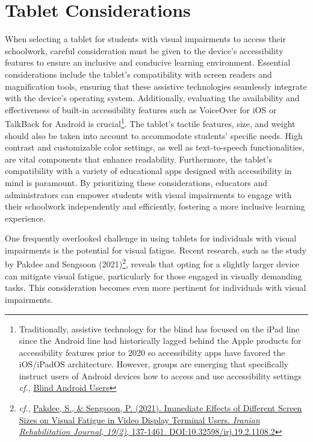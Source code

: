 \documentclass[12pt,letterpaper,twoside]{extreport}
\begin{document}
\hypertarget{tablet-considerations}{}\section{Tablet Considerations}\label{tab:tablelet-considerations}

When selecting a tablet for students with visual impairments to access their schoolwork, careful consideration must be given to the device's accessibility features to ensure an inclusive and conducive learning environment. Essential considerations include the tablet's compatibility with screen readers and magnification tools, ensuring that these assistive technologies seamlessly integrate with the device's operating system. Additionally, evaluating the availability and effectiveness of built-in accessibility features such as VoiceOver for iOS or TalkBack for Android is crucial\footnote{Traditionally, assistive technology for the blind has focused on the iPad line since the Android line had historically lagged behind the Apple products for accessibility features prior to 2020 so accessibility apps have favored the iOS/iPadOS architecture. However, groups are emerging that specifically instruct users of Android devices how to access and use accessibility settings \textit{cf.}, \href{https://www.youtube.com/channel/UCvEM-SmpwElNALldhp8hG1g}{Blind Android Users}}. The tablet's tactile features, size, and weight should also be taken into account to accommodate students' specific needs. High contrast and customizable color settings, as well as text-to-speech functionalities, are vital components that enhance readability. Furthermore, the tablet's compatibility with a variety of educational apps designed with accessibility in mind is paramount. By prioritizing these considerations, educators and administrators can empower students with visual impairments to engage with their schoolwork independently and efficiently, fostering a more inclusive learning experience.

One frequently overlooked challenge in using tablets for individuals with visual impairments is the potential for visual fatigue. Recent research, such as the study by Pakdee and Sengsoon (2021)\footnote{\textit{cf}., \href{https://www.researchgate.net/publication/352764109_Immediate_Effects_of_Different_Screen_Sizes_on_Visual_Fatigue_in_Video_Display_Terminal_Users}{Pakdee, S., \& Sengsoon, P. (2021). Immediate Effects of Different Screen Sizes on Visual Fatigue in Video Display Terminal Users. \textit{Iranian Rehabilitation Journal, 19(2)}, 137-1461. DOI:10.32598/irj.19.2.1108.2}}, reveals that opting for a slightly larger device can mitigate visual fatigue, particularly for those engaged in visually demanding tasks. This consideration becomes even more pertinent for individuals with visual impairments.
\end{document}
